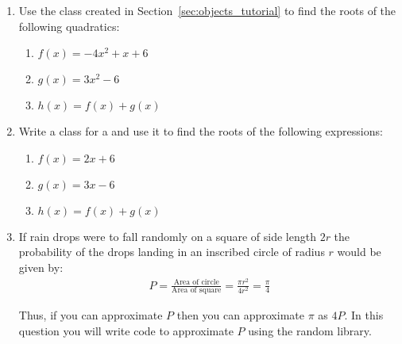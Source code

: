 \begin{enumerate}

\item 

Use the class created in Section~\ref{sec:objects_tutorial} to find the roots of the
following quadratics:
\begin{enumerate}

\item 

\(f(x) = -4x ^ 2 + x + 6\)

\item 

\(g(x) = 3x ^ 2 - 6\)

\item 

\(h(x) = f(x) + g(x)\)

\end{enumerate}

\item 

Write a class for a  and use it to find the roots of the
following expressions:
\begin{enumerate}

\item 

\(f(x) = 2x + 6\)

\item 

\(g(x) = 3x - 6\)

\item 

\(h(x) = f(x) + g(x)\)

\end{enumerate}

\item 

If rain drops were to fall randomly on a square of side length \(2r\) the
probability of the drops landing in an inscribed circle of radius \(r\) would
be given by:
\begin{equation*}
\begin{split}
       P = \frac{\text{Area of circle}}{\text{Area of square}}=\frac{\pi r ^2}{4r^2}=\frac{\pi}{4}
   \end{split}
\end{equation*}

Thus, if you can approximate \(P\) then you can approximate \(\pi\) as \(4P\). In this
question you will write code to approximate \(P\) using the random library.



\end{enumerate}
